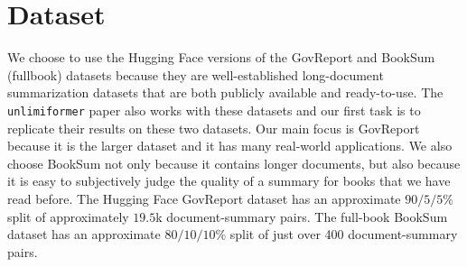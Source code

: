 \section*{Dataset}
We choose to use the Hugging Face versions of the  GovReport 
\cite{huang2021efficient} and BookSum \cite{kryscinski2021booksum} (fullbook)
datasets because they are well-established long-document summarization datasets
that are both publicly available and ready-to-use. The \texttt{unlimiformer}
paper also works with these datasets and our first task is to replicate their
results on these two datasets. Our main focus is GovReport because it is the
larger dataset and it has many real-world applications. We also choose BookSum
not only because it contains longer documents, but also because it is easy to
subjectively judge the quality of a summary for books that we have read before.
The Hugging Face GovReport dataset has an approximate $90/5/5\%$ split of
approximately $19.5$k document-summary pairs. The full-book BookSum dataset
has an approximate $80/10/10\%$ split of just over 400 document-summary pairs. 
